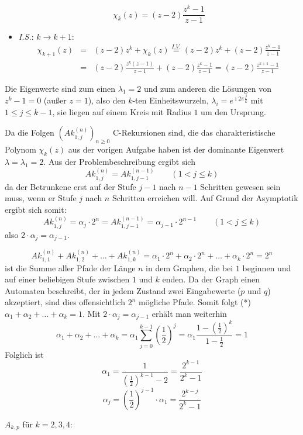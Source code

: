 \begin{flushenum}
\begin{itemize}
			\[ \chi_k(z) = (z-2)\frac{z^k - 1}{z-1} \]
		\item \textit{I.S.}: $k \rightarrow k+1$:
			\begin{eqnarray*}
			\chi_{k+1}(z) &=& (z-2) z^{k} + \chi_k(z) \overset{I.V.}{=} (z-2) z^k + (z-2) \frac{z^k - 1}{z-1} \\
			   &=& (z-2) \frac{z^k (z-1)}{z-1} + (z-2)\frac{z^k - 1}{z-1} =
			   (z-2) \frac{z^{k+1} - 1}{z-1}
			\end{eqnarray*}
	\end{itemize}
	Die Eigenwerte sind zum einen $\lambda_1 = 2$ und zum anderen die Lösungen von $z^k - 1 = 0$ (außer $z = 1$), also den
	$k$-ten Einheitswurzeln, $\lambda_i = e^{\imath 2 \pi \frac{j}{k}}$ mit $1 \leq j \leq k-1$, sie liegen
	auf einem Kreis mit Radius $1$ um den Ursprung.

\item 
Da die Folgen $\left( Ak_{1,j}^{(n)} \right)_{n \geq 0}$ C-Rekursionen sind, die das charakteristische Polynom $\chi_k(z)$
aus der vorigen Aufgabe haben ist der dominante Eigenwert $\lambda = \lambda_1 = 2$.
Aus der Problembeschreibung ergibt sich 
\[ Ak_{1,j}^{(n)} = Ak_{1,j-1}^{(n-1)} \quad \quad (1 < j \leq k) \]
da der Betrunkene erst auf der Stufe $j-1$ nach $n-1$ Schritten gewesen sein muss, wenn er Stufe $j$ nach $n$ Schritten erreichen will.
Auf Grund der Asymptotik ergibt sich somit:
\[ Ak_{1,j}^{(n)} = \alpha_j \cdot 2^n = Ak_{1,j-1}^{(n-1)} = \alpha_{j-1} \cdot 2^{n-1} \quad \quad (1 < j \leq k) \]
also $2 \cdot \alpha_j = \alpha_{j-1}$.

\[ Ak_{1,1}^{(n)} + Ak_{1,2}^{(n)} + \ldots + Ak_{1,k}^{(n)} = \alpha_1 \cdot 2^n + \alpha_2 \cdot 2^n + \ldots + \alpha_k \cdot 2^n = 2^n \]
ist die Summe aller Pfade der Länge $n$ in dem Graphen, die bei $1$ beginnen und auf einer beliebigen Stufe zwischen $1$ und $k$ enden.
Da der Graph einen Automaten beschreibt, der in jedem Zustand zwei Eingabewerte ($p$ und $q$) akzeptiert, sind dies offensichtlich
$2^n$ mögliche Pfade.
Somit folgt (*) $\alpha_1 + \alpha_2 + \ldots + \alpha_k = 1$.
Mit $2 \cdot \alpha_j = \alpha_{j-1} $ erhält man weiterhin 
\[ \alpha_1 + \alpha_2 + \ldots + \alpha_k = \alpha_1 \sum_{j=0}^{k-1} \left( \frac{1}{2}\right)^j 
   = \alpha_1  \frac{1 - \left(\frac{1}{2}\right)^k}{1 - \frac{1}{2}}  = 1 \]
Folglich ist 
\[ \alpha_1 = \frac{1}{\left(\frac{1}{2}\right)^{k-1} - 2} = \frac{2^{k-1}}{2^k - 1} \]
\[ \alpha_j = \left(\frac{1}{2}\right)^{j-1} \cdot \alpha_1 = \frac{2^{k-j}}{2^k - 1}\]

\item
  $A_{k,p}$ für $k = 2, 3, 4$:


\end{flushenum}
